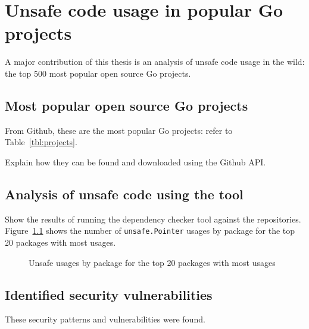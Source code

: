 
\chapter{Unsafe code usage in popular Go projects}\label{ch:survey}

A major contribution of this thesis is an analysis of unsafe code usage in the wild:
the top 500 most popular open source Go projects.



\section{Most popular open source Go projects}\label{sec:most-popular-projects}

From Github, these are the most popular Go projects: refer to Table~\ref{tbl:projects}.

Explain how they can be found and downloaded using the Github API.



\section{Analysis of unsafe code using the tool}\label{sec:survey}

Show the results of running the dependency checker tool against the repositories. Figure~\ref{fig:unsafe-usages-by-package-n20}
shows the number of \texttt{unsafe.Pointer} usages by package for the top 20 packages with most usages.

\begin{figure}[h]
    \begin{center}
        
    \end{center}
    \caption{Unsafe usages by package for the top 20 packages with most usages}
    \label{fig:unsafe-usages-by-package-n20}
\end{figure}



\section{Identified security vulnerabilities}\label{sec:identified-vulnerabilities}

These security patterns and vulnerabilities were found.
